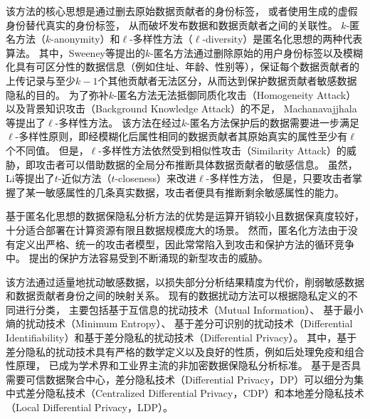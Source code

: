 该方法的核心思想是通过删去原始数据贡献者的身份标签，
或者使用生成的虚假身份替代真实的身份标签，
从而破坏发布数据和数据贡献者之间的关联性\cite{DBLP:conf/icde/LiLZ09}。
$k$-匿名方法（$k$-anonymity）和$\ell$-多样性方法（$\ell$-diversity）是匿名化思想的两种代表算法。
其中，Sweeney等\cite{DBLP:journals/ijufks/Sweene02}提出的$k$-匿名方法通过删除原始的用户身份标签以及模糊化具有可区分性的数据信息（例如住址、年龄、性别等），保证每个数据贡献者的上传记录与至少$k-1$个其他贡献者无法区分，从而达到保护数据贡献者敏感数据隐私的目的。
为了弥补$k$-匿名方法无法抵御同质化攻击（Homogeneity Attack）以及背景知识攻击（Background Knowledge Attack）的不足，
Machanavajjhala等\cite{DBLP:conf/icde/MachanavajjhalaGKV06}提出了$\ell$-多样性方法。
该方法在经过$k$-匿名方法保护后的数据需要进一步满足$\ell$-多样性原则，即经模糊化后属性相同的数据贡献者其原始真实的属性至少有$\ell$个不同值。
但是，$\ell$-多样性方法依然受到相似性攻击（Similarity Attack）的威胁，即攻击者可以借助数据的全局分布推断具体数据贡献者的敏感信息。
虽然，Li等\cite{DBLP:conf/icde/LiLV07}提出了$t$-近似方法（$t$-closeness）来改进$\ell$-多样性方法，
但是，只要攻击者掌握了某一敏感属性的几条真实数据，攻击者便具有推断剩余敏感属性的能力\cite{DBLP:journals/kbs/Domingo-FerrerS15}。

基于匿名化思想的数据保隐私分析方法的优势是运算开销较小且数据保真度较好，
十分适合部署在计算资源有限且数据规模庞大的场景。
然而，匿名化方法由于没有定义出严格、统一的攻击者模型，因此常常陷入到攻击和保护方法的循环竞争中。
提出的保护方法容易受到不断涌现的新型攻击的威胁。

该方法通过适量地扰动敏感数据，以损失部分分析结果精度为代价，削弱敏感数据和数据贡献者身份之间的映射关系。
现有的数据扰动方法可以根据隐私定义的不同进行分类，
主要包括基于互信息的扰动技术（Mutual Information）\cite{cuff2016differential}、
基于最小熵的扰动技术（Minimum Entropy）\cite{alvim2011differential}、
基于差分可识别的扰动技术（Differential Identifiability）\cite{lee2012differential}和基于差分隐私的扰动技术（Differential Privacy）\cite{dwork2008differential}。
其中，基于差分隐私的扰动技术具有严格的数学定义以及良好的性质，例如后处理免疫和组合性原理，
已成为学术界和工业界主流的非加密数据保隐私分析标准\cite{wang2016relation}。
基于是否具需要可信数据聚合中心，差分隐私技术（Differential Privacy，DP）可以细分为集中式差分隐私技术（Centralized Differential Privacy，CDP）和本地差分隐私技术（Local Differential Privacy，LDP）。

